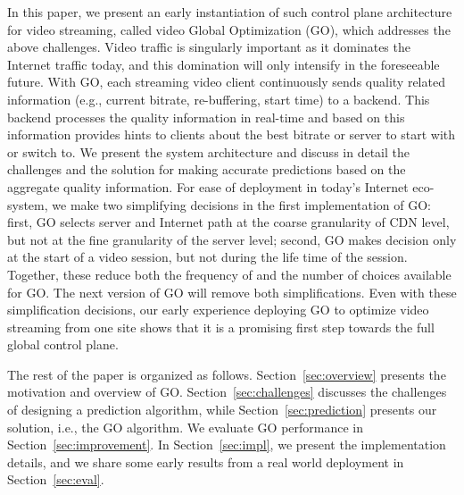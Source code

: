 In this paper, we present an early instantiation of such control plane architecture for video streaming, called video Global Optimization (GO), which addresses the above challenges.  Video traffic is singularly important as it dominates the Internet traffic today, and this domination will only intensify in the foreseeable future. With GO, each streaming video client continuously sends quality related information (e.g., current bitrate, re-buffering, start time) to a backend. This backend processes the quality information in real-time and based on this information provides hints to clients about the best bitrate or server to start with or switch to. We present the system architecture and discuss in detail the challenges and the solution for making accurate predictions based on the aggregate quality information. For ease of deployment in today's Internet eco-system, we make two simplifying decisions in the first implementation of GO: first, GO selects server and Internet path at the coarse granularity of CDN level, but not at the fine granularity of the server level; second, GO makes decision only at the start of a video session, but not during the life time of the session.  Together, these reduce both the frequency of and the number of choices available for GO.  The next version of GO will remove both simplifications. Even with these simplification decisions, our early experience deploying GO to optimize video streaming from one site shows that it is a promising first step towards the full global control plane. 
   
The rest of the paper is organized as follows. Section~\ref{sec:overview} presents the motivation and overview of GO. Section~\ref{sec:challenges} discusses the challenges of designing a prediction algorithm, while Section~\ref{sec:prediction} presents our solution, i.e., the GO algorithm. We evaluate GO performance in Section~\ref{sec:improvement}. In Section~\ref{sec:impl}, we present the implementation details, and we share some early results from a real world deployment in Section~\ref{sec:eval}. 
